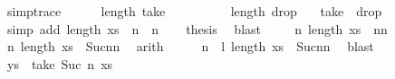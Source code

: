 \begin{isabellebody}
\ {\isacharbrackleft}{\kern0pt}{\isacharbrackleft}{\kern0pt}simp{\isacharunderscore}{\kern0pt}trace{\isacharbrackright}{\kern0pt}{\isacharbrackright}{\kern0pt}\isanewline
\ \ \ \ \isamarkupfalse%
\ {\isachardoublequoteopen}length\ {\isacharparenleft}{\kern0pt}take\ {\isacharunderscore}{\kern0pt}\ {\isacharunderscore}{\kern0pt}{\isacharparenright}{\kern0pt}{\isachardoublequoteclose}\ \ \isanewline
\ \ \ \ \isamarkupfalse%
\ {\isachardoublequoteopen}length\ {\isacharparenleft}{\kern0pt}drop\ {\isacharunderscore}{\kern0pt}\ {\isacharunderscore}{\kern0pt}{\isacharparenright}{\kern0pt}{\isachardoublequoteclose}\isanewline
{}\isamarkupfalse%
\ {\isachardoublequoteopen}take\ {\isacharunderscore}{\kern0pt}\ {\isacharparenleft}{\kern0pt}drop\ {\isacharunderscore}{\kern0pt}\ {\isacharunderscore}{\kern0pt}{\isacharparenright}{\kern0pt}{\isachardoublequoteclose}\isanewline
\ \ \ \ \isamarkupfalse%
\ {\isacharparenleft}{\kern0pt}simp\ add{\isacharcolon}{\kern0pt}\ {\isacharbackquoteopen}length\ xs\ {\isacharequal}{\kern0pt}\ n\ {\isacharplus}{\kern0pt}\ n{\isacharbackquoteclose}{\isacharparenright}{\kern0pt}\isanewline
\ \ \isamarkupfalse%
\ {\isacharquery}{\kern0pt}thesis\ \isamarkupfalse%
\ blast\isanewline
{}\isamarkupfalse%
\isanewline
\ \ \isamarkupfalse%
\ {\isachardoublequoteopen}{\isasymnot}\ {\isacharparenleft}{\kern0pt}{\isasymexists}n{\isachardot}{\kern0pt}\ length\ xs\ {\isacharequal}{\kern0pt}\ n{\isacharplus}{\kern0pt}n{\isacharparenright}{\kern0pt}{\isachardoublequoteclose}\isanewline
\ \ \isamarkupfalse%
\ {\isachardoublequoteopen}{\isasymexists}n{\isachardot}{\kern0pt}\ length\ xs\ {\isacharequal}{\kern0pt}\ Suc{\isacharparenleft}{\kern0pt}n{\isacharplus}{\kern0pt}n{\isacharparenright}{\kern0pt}{\isachardoublequoteclose}\ \isamarkupfalse%
\ arith\isanewline
\ \ \isamarkupfalse%
\ \isamarkupfalse%
\ n\ \ l{\isacharcolon}{\kern0pt}\ {\isachardoublequoteopen}length\ xs\ {\isacharequal}{\kern0pt}\ Suc{\isacharparenleft}{\kern0pt}n{\isacharplus}{\kern0pt}n{\isacharparenright}{\kern0pt}{\isachardoublequoteclose}\ \isamarkupfalse%
\ blast\isanewline
\ \ \isamarkupfalse%
\ {\isacharquery}{\kern0pt}ys\ {\isacharequal}{\kern0pt}\ {\isachardoublequoteopen}take\ {\isacharparenleft}{\kern0pt}Suc\ n{\isacharparenright}{\kern0pt}\ xs{\isachardoublequoteclose}\isanewline

\end{isabellebody}
